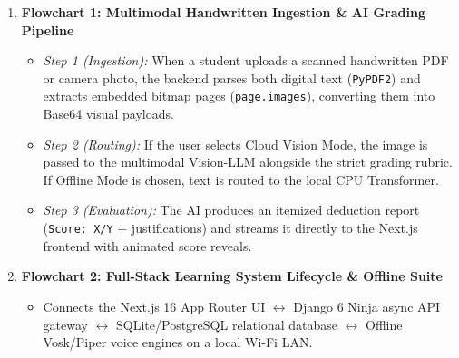 \documentclass[11pt,a4paper]{article}
\begin{document}
\begin{enumerate}[leftmargin=*]
    \item \textbf{Flowchart 1: Multimodal Handwritten Ingestion \& AI Grading Pipeline}
    \begin{itemize}
        \item \textit{Step 1 (Ingestion):} When a student uploads a scanned handwritten PDF or camera photo, the backend parses both digital text (\texttt{PyPDF2}) and extracts embedded bitmap pages (\texttt{page.images}), converting them into Base64 visual payloads.
        \item \textit{Step 2 (Routing):} If the user selects Cloud Vision Mode, the image is passed to the multimodal Vision-LLM alongside the strict grading rubric. If Offline Mode is chosen, text is routed to the local CPU Transformer.
        \item \textit{Step 3 (Evaluation):} The AI produces an itemized deduction report (\texttt{Score: X/Y} + justifications) and streams it directly to the Next.js frontend with animated score reveals.
    \end{itemize}
    \item \textbf{Flowchart 2: Full-Stack Learning System Lifecycle \& Offline Suite}
    \begin{itemize}
        \item Connects the Next.js 16 App Router UI $\leftrightarrow$ Django 6 Ninja async API gateway $\leftrightarrow$ SQLite/PostgreSQL relational database $\leftrightarrow$ Offline Vosk/Piper voice engines on a local Wi-Fi LAN.
    \end{itemize}
\end{enumerate}

\end{document}
